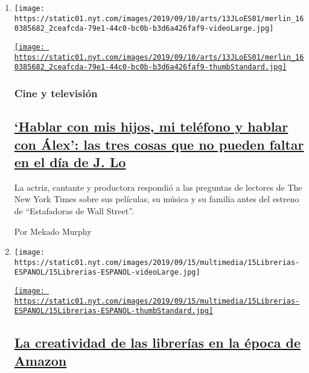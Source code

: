 \begin{enumerate}
\def\labelenumi{\arabic{enumi}.}
\item
  \texttt{[image: https://static01.nyt.com/images/2019/09/10/arts/13JLoES01/merlin\_160385682\_2ceafcda-79e1-44c0-bc0b-b3d6a426faf9-videoLarge.jpg]}

  \href{/es/2019/09/13/espanol/cultura/jennifer-lopez-hustlers.html}{\texttt{[image: https://static01.nyt.com/images/2019/09/10/arts/13JLoES01/merlin\_160385682\_2ceafcda-79e1-44c0-bc0b-b3d6a426faf9-thumbStandard.jpg]}}

  \hypertarget{cine-y-televisiuxf3n}{%
  \subsubsection{Cine y televisión}\label{cine-y-televisiuxf3n}}

  \hypertarget{hablar-con-mis-hijos-mi-teluxe9fono-y-hablar-con-uxe1lex-las-tres-cosas-que-no-pueden-faltar-en-el-duxeda-de-j-lo}{%
  \subsection{\texorpdfstring{\href{/es/2019/09/13/espanol/cultura/jennifer-lopez-hustlers.html}{`Hablar
  con mis hijos, mi teléfono y hablar con Álex': las tres cosas que no
  pueden faltar en el día de J.
  Lo}}{`Hablar con mis hijos, mi teléfono y hablar con Álex': las tres cosas que no pueden faltar en el día de J. Lo}}\label{hablar-con-mis-hijos-mi-teluxe9fono-y-hablar-con-uxe1lex-las-tres-cosas-que-no-pueden-faltar-en-el-duxeda-de-j-lo}}

  La actriz, cantante y productora respondió a las preguntas de lectores
  de The New York Times sobre sus películas, su música y su familia
  antes del estreno de ``Estafadoras de Wall Street''.

  Por Mekado Murphy
\item
  \texttt{[image: https://static01.nyt.com/images/2019/09/15/multimedia/15Librerias-ESPANOL/15Librerias-ESPANOL-videoLarge.jpg]}

  \href{/es/2019/09/15/espanol/cultura/librerias-bodas-nuevas-tendencias.html}{\texttt{[image: https://static01.nyt.com/images/2019/09/15/multimedia/15Librerias-ESPANOL/15Librerias-ESPANOL-thumbStandard.jpg]}}

  \hypertarget{la-creatividad-de-las-libreruxedas-en-la-uxe9poca-de-amazon}{%
  \subsection{\texorpdfstring{\href{/es/2019/09/15/espanol/cultura/librerias-bodas-nuevas-tendencias.html}{La
  creatividad de las librerías en la época de
  Amazon}}{La creatividad de las librerías en la época de Amazon}}\label{la-creatividad-de-las-libreruxedas-en-la-uxe9poca-de-amazon}}


\end{enumerate}
